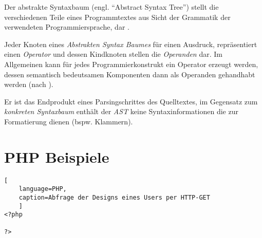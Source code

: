 \begin{thesisDefinition}
Der abstrakte Syntaxbaum (engl. \enquote{Abstract Syntax Tree}) stellt die verschiedenen Teile eines Programmtextes aus Sicht der Grammatik der verwendeten Programmiersprache, dar \cite[][S. 9 ff.]{gruneCompiler}.
\end{thesisDefinition}
\begin{thesisDefinition}
Jeder Knoten eines \emph{Abstrakten Syntax Baumes} für einen Ausdruck, repräsentiert einen \emph{Operator} und dessen Kindknoten stellen die  \emph{Operanden} dar. Im Allgemeinen kann für jedes Programmierkonstrukt ein Operator erzeugt werden, dessen semantisch bedeutsamen Komponenten dann als Operanden gehandhabt werden (nach \cite{ahoCompiler}).
\end{thesisDefinition}
Er ist das Endprodukt eines Parsingschrittes des Quelltextes, im Gegensatz zum \emph{konkreten Syntaxbaum} enthält der \emph{AST} keine Syntaxinformationen die zur Formatierung dienen (bspw. Klammern). 

\section{PHP Beispiele}

\begin{lstlisting}[
    language=PHP,
    caption=Abfrage der Designs eines Users per HTTP-GET
    ]
<?php

?>
\end{lstlisting}
